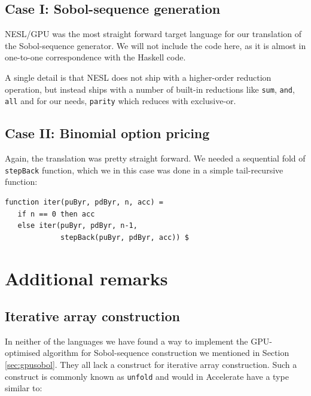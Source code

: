 \documentclass[preprint]{sigplanconf}
\begin{document}
\subsection{Case I: Sobol-sequence generation}
NESL/GPU was the most straight forward target language for our
translation of the Sobol-sequence generator. We will not include the
code here, as it is almost in one-to-one correspondence with the
Haskell code. 

A single detail is that NESL does not ship with a higher-order
reduction operation, but instead ships with a number of built-in
reductions like \verb|sum|, \verb|and|, \verb|all| and for our needs,
\verb|parity| which reduces with exclusive-or.

\subsection{Case II: Binomial option pricing}
Again, the translation was pretty straight forward. We needed a
sequential fold of \verb|stepBack| function, which we in this case was
done in a simple tail-recursive function:
\begin{verbatim}
function iter(puByr, pdByr, n, acc) =
   if n == 0 then acc
   else iter(puByr, pdByr, n-1, 
             stepBack(puByr, pdByr, acc)) $
\end{verbatim}


\section{Additional remarks}
\subsection{Iterative array construction}
\label{sec:itercons}
In neither of the languages we have found a way to implement the
GPU-optimised algorithm for Sobol-sequence construction we mentioned
in Section \ref{sec:gpusobol}. They all lack a construct for iterative
array construction. Such a construct is commonly known as
\verb|unfold| and would in Accelerate have a type similar to:
\end{document}
